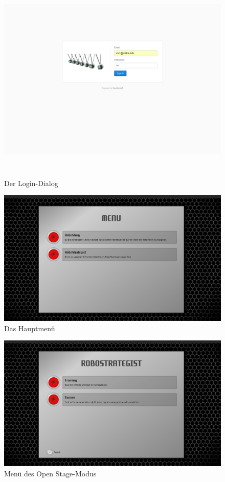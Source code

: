\begin{figure}
  \centering
  \label{login}
  \includegraphics[width=15cm, height=10cm, keepaspectratio]{figures/1-login.png}
  \caption{Der Login-Dialog}
\end{figure}

\begin{figure}
  \centering
  \label{main-menu}
  \includegraphics[width=15cm, keepaspectratio]{figures/2-main-menu.png}
  \caption{Das Hauptmenü}
\end{figure}

\begin{figure}
  \centering
  \label{openstage-menu}
  \includegraphics[width=15cm, keepaspectratio]{figures/3-robostrategist-menu.png}
  \caption{Menü des Open Stage-Modus}
\end{figure}

